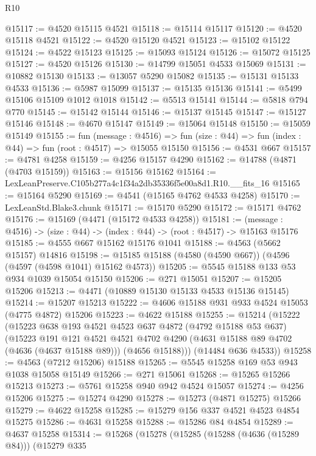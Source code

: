 \begin{lexlean}{R10}
\begin{coremodule}
@15117 := @4520 @15115 @4521
@15118 := @15114 @15117
@15120 := @4520 @15118 @4521
@15122 := @4520 @15120 @4521
@15123 := @15102 @15122
@15124 := @4522 @15123
@15125 := @15093 @15124
@15126 := @15072 @15125
@15127 := @4520 @15126
@15130 := @14799 @15051 @4533 @15069
@15131 := @10882 @15130
@15133 := @13057 @5290 @15082
@15135 := @15131 @15133 @4533
@15136 := @5987 @15099
@15137 := @15135 @15136
@15141 := @5499 @15106 @15109 @1012 @1018
@15142 := @5513 @15141
@15144 := @5818 @794 @770
@15145 := @15142 @15144
@15146 := @15137 @15145
@15147 := @15127 @15146
@15148 := @4670 @15147
@15149 := @15064 @15148
@15150 := @15059 @15149
@15155 := fun (message : @4516) =>
  fun (size : @44) => fun (index : @44) => fun (root : @4517) => @15055 @15150
@15156 := @4531 @667
@15157 := @4781 @4258
@15159 := @4256 @15157 @4290
@15162 := @14788 (@4871 (@4703 @15159))
@15163 := @15156 @15162
@15164 := LexLeanPreserve.C105b277a4c1f34a2db35336f5e00a8d1.R10.__fits_16
@15165 := @15164 @5290
@15169 := @4541 (@15165 @4762 @4533 @4258)
@15170 := LexLeanStd.Blake3.chunk
@15171 := @15170 @5290
@15172 := @15171 @4762
@15176 := @15169 (@4471 (@15172 @4533 @4258))
@15181 := (message : @4516) -> (size : @44) -> (index : @44) -> (root : @4517) -> @15163 @15176
@15185 := @4555 @667 @15162 @15176 @1041
@15188 := @4563 (@5662 @15157) @14816
@15198 := @15185 @15188 (@4580 (@4590 @667)) (@4596 (@4597 (@4598 @1041) @15162 @4573))
@15205 := @5545 @15188 @133 @53 @934 @1039 @15054 @15150
@15206 := @271 @15051
@15207 := @15205 @15206
@15213 := @4471 (@10889 @15130 @15133 @4533 @15136 @15145)
@15214 := @15207 @15213
@15222 := @4606 @15188 @931 @933 @4524 @15053 (@4775 @4872) @15206
@15223 := @4622 @15188
@15255 := @15214
    (@15222
      (@15223
        @638
        @193
        @4521
        @4523
        @637
        @4872
        (@4792 @15188 @53 @637)
        (@15223
          @191
          @121
          @4521
          @4521
          @4702
          @4290
          (@4631 @15188 @89 @4702 (@4636 (@4637 @15188 @89)))
          (@4656 @15188)))
      (@14484 @636 @4533))
@15258 := @4563 (@7212 @15206) @15188
@15265 := @5545 @15258 @169 @53 @943 @1038 @15058 @15149
@15266 := @271 @15061
@15268 := @15265 @15266 @15213
@15273 := @5761 @15258 @940 @942 @4524 @15057
@15274 := @4256 @15206
@15275 := @15274 @4290
@15278 := @15273 (@4871 @15275) @15266
@15279 := @4622 @15258
@15285 := @15279 @156 @337 @4521 @4523 @4854 @15275
@15286 := @4631 @15258
@15288 := @15286 @84 @4854
@15289 := @4637 @15258
@15314 := @15268
    (@15278
      (@15285
        (@15288 (@4636 (@15289 @84)))
        (@15279
          @335

\end{coremodule}
\end{lexlean}
